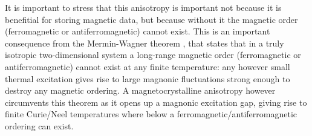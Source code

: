 It is important to stress that this anisotropy is important not because it is benefitial for storing magnetic data, but because without it the magnetic order (ferromagnetic or antiferromagnetic) cannot exist. This is an important consequence from the Mermin-Wagner theorem \cite{mermin_absence_1966}, that states that in a truly isotropic two-dimensional system a long-range magnetic order (ferromagnetic or antiferromagnetic) cannot exist at any finite temperature: any however small thermal excitation gives rise to large magnonic fluctuations strong enough to destroy any magnetic ordering. A magnetocrystalline anisotropy however circumvents this theorem as it opens up a magnonic excitation gap, giving rise to finite Curie/Neel temperatures where below a ferromagnetic/antiferromagnetic ordering can exist. 



